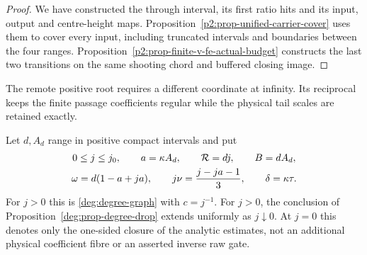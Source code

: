 \begin{proof}
We have constructed the through interval, its first ratio hits and its
input, output and centre-height maps. Proposition~\ref{p2:prop-unified-carrier-cover}
uses them to cover every input, including truncated intervals and
boundaries between the four ranges. Proposition~\ref{p2:prop-finite-v-fe-actual-budget}
constructs the last two transitions on the same shooting chord and
buffered closing image.
\end{proof}

The remote positive root requires a different coordinate at infinity.
Its reciprocal keeps the finite passage coefficients regular while the
physical tail scales are retained exactly.

\begin{proposition}\label{deg:prop-degree-infinity}
Let \(d,A_d\) range in positive compact intervals and put
\begin{equation}
 \begin{gathered}
 0\le j\le j_0,\qquad a=\kappa A_d,\qquad
 \mathcal R=dj,\qquad B=dA_d,\\
 \omega=d(1-a+ja),\qquad
 j\nu={j-ja-1\over3},\qquad \delta=\kappa\tau .
 \end{gathered}
 \label{deg:degree-infinity-graph}
\end{equation}
For \(j>0\) this is \eqref{deg:degree-graph} with \(c=j^{-1}\).
For \(j>0\), the conclusion of Proposition~\ref{deg:prop-degree-drop}
extends uniformly as \(j\downarrow0\). At \(j=0\) this denotes only the
one-sided closure of the analytic estimates, not an additional physical
coefficient fibre or an asserted inverse raw gate.
\end{proposition}

